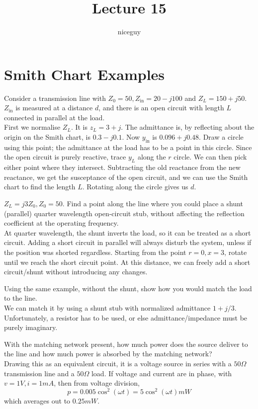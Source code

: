 \documentclass[12pt]{article}
\title{Lecture 15}
\author{niceguy}
\begin{document}
\maketitle

\section{Smith Chart Examples}

Consider a transmission line with $Z_0 = 50, Z_{\text{in}} = 20 - j100$ and $Z_L = 150 + j50$. $Z_{\text{in}}$ is measured at a distance $d$, and there is an open circuit with length $L$ connected in parallel at the load. \\
First we normalise $Z_L$. It is $z_L = 3 + j$. The admittance is, by reflecting about the origin on the Smith chart, is $0.3 - j0.1$. Now $y_{\text{in}}$ is $0.096 + j0.48$. Draw a circle using this point; the admittance at the load has to be a point in this circle. Since the open circuit is purely reactive, trace $y_L$ along the $r$ circle. We can then pick either point where they intersect. Subtracting the old reactance from the new reactance, we get the susceptance of the open circuit, and we can use the Smith chart to find the length $L$. Rotating along the circle gives us $d$.

\begin{ex}
    $Z_L = j3Z_0, Z_0 = 50$. Find a point along the line where you could place a shunt (parallel) quarter wavelength open-circuit stub, without affecting the reflection coefficient at the operating frequency. \\
    At quarter wavelength, the shunt inverts the load, so it can be treated as a short circuit. Adding a short circuit in parallel will always disturb the system, unless if the position was shorted regardless. Starting from the point $r = 0, x = 3$, rotate until we reach the short circuit point. At this distance, we can freely add a short circuit/shunt without introducing any changes.
\end{ex}

\begin{ex}
    Using the same example, without the shunt, show how you would match the load to the line. \\
    We can match it by using a shunt stub with normalized admittance $1 + j/3$. Unfortunately, a resistor has to be used, or else admittance/impedance must be purely imaginary.
\end{ex}

\begin{ex}
    With the matching network present, how much power does the source deliver to the line and how much power is absorbed by the matching network? \\
    Drawing this as an equivalent circuit, it is a voltage source in series with a $50\unit{\Omega}$ transmission line and a $50\unit{\Omega}$ load. If voltage and current are in phase, with $v = 1\unit{V}, i = 1\unit{mA}$, then from voltage division,
    $$p = 0.005\cos^2(\omega t) = 5\cos^2(\omega t)\unit{mW}$$
    which averages out to $0.25\unit{mW}$.
\end{ex}
\end{document}
